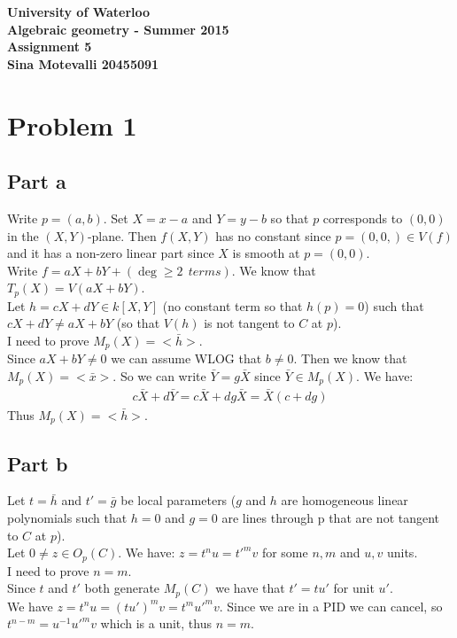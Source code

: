 \documentclass[12pt]{article}
\begin{document}
\begin{center}
  {\Large\bf University of Waterloo}\\
  \vspace{3mm}
         {\Large\bf Algebraic geometry - Summer 2015}\\
         \vspace{2mm}
                {\Large\bf Assignment 5}\\
                \vspace{3mm}
                \textbf{Sina Motevalli 20455091}
\end{center}
\section*{Problem 1}
\subsection*{Part a}
Write $p=(a,b)$. Set $X=x-a$ and $Y=y-b$ so that $p$ corresponds to $(0,0)$ in the
$(X,Y)$-plane. Then $f(X,Y)$ has no constant since $p=(0,0,) \in V(f)$ and it has a non-zero linear part since $X$ is smooth at $p=(0,0)$. \\
Write $f=aX+bY+(\deg \ge 2  \ \ terms)$. We know that $T_p(X)=V(aX+bY)$. \\
Let $h=cX+dY \in k[X,Y]$ (no constant term so that $h(p)=0$) such that
$cX+dY \not= aX+bY$ (so that $V(h)$ is not tangent to $C$ at $p$). \\
I need to prove $M_p(X)=<\bar{h}>$.\\
Since $aX+bY \not=0$ we can assume WLOG that $b \not=0$. Then we know that
$M_p(X)=<\bar{x}>$. So we can write $\bar{Y}=g\bar{X}$ since $\bar{Y} \in M_p(X)$.
We have:
\begin{eqnarray*}
c\bar{X}+d\bar{Y} = c\bar{X}+dg\bar{X}=\bar{X}(c+dg)
\end{eqnarray*}
Thus $M_p(X)=<\bar{h}>$. 

\subsection*{Part b}
Let $t=\bar{h}$ and $t'=\bar{g}$ be local parameters ($g$ and $h$ are
homogeneous linear polynomials such that $h= 0$ and $g=0$ are lines through p that are not tangent to $C$ at $p$). \\
Let $0 \not= z \in O_p(C)$. We have: $z=t^nu=t'^mv$ for some $n,m$ and $u,v$ units. \\
I need to prove $n=m$. \\
Since $t$ and $t'$ both generate $M_p(C)$ we have that $t'=tu'$ for unit $u'$. \\
We have $z=t^nu=(tu')^mv=t^mu'^mv$. Since we are in a PID we can cancel, so\\
$t^{n-m}=u^{-1}u'^mv$ which is a unit, thus $n=m$.
\end{document}
